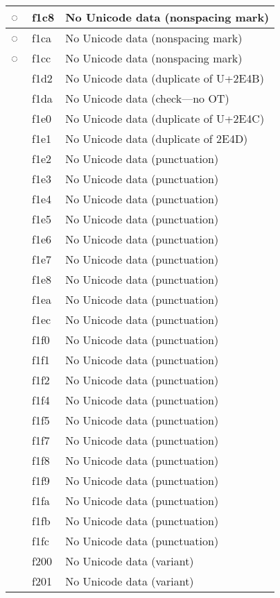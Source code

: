 \documentclass[12pt,letterpaper,openany]{book}
\begin{document}
\begin{center}
\begin{supertabular}{|m{0.25in}|m{0.5in}|m{4in}|}
◌ & f1c8 & No Unicode data (nonspacing mark)\\\hline
◌ & f1ca & No Unicode data (nonspacing mark)\\\hline
◌ & f1cc & No Unicode data (nonspacing mark)\\\hline
 & f1d2 & No Unicode data (duplicate of U+2E4B)\\\hline
 & f1da & No Unicode data (check---no OT)\\\hline
 & f1e0 & No Unicode data (duplicate of U+2E4C)\\\hline
 & f1e1 & No Unicode data (duplicate of 2E4D)\\\hline
 & f1e2 & No Unicode data (punctuation)\\\hline
 & f1e3 & No Unicode data (punctuation)\\\hline
 & f1e4 & No Unicode data (punctuation)\\\hline
 & f1e5 & No Unicode data (punctuation)\\\hline
 & f1e6 & No Unicode data (punctuation)\\\hline
 & f1e7 & No Unicode data (punctuation)\\\hline
 & f1e8 & No Unicode data (punctuation)\\\hline
 & f1ea & No Unicode data (punctuation)\\\hline
 & f1ec & No Unicode data (punctuation)\\\hline
 & f1f0 & No Unicode data (punctuation)\\\hline
 & f1f1 & No Unicode data (punctuation)\\\hline
 & f1f2 & No Unicode data (punctuation)\\\hline
 & f1f4 & No Unicode data (punctuation)\\\hline
 & f1f5 & No Unicode data (punctuation)\\\hline
 & f1f7 & No Unicode data (punctuation)\\\hline
 & f1f8 & No Unicode data (punctuation)\\\hline
 & f1f9 & No Unicode data (punctuation)\\\hline
 & f1fa & No Unicode data (punctuation)\\\hline
 & f1fb & No Unicode data (punctuation)\\\hline
 & f1fc & No Unicode data (punctuation)\\\hline
 & f200 & No Unicode data (variant)\\\hline
 & f201 & No Unicode data (variant)\\\hline

\end{supertabular}
\end{center}
\end{document}
